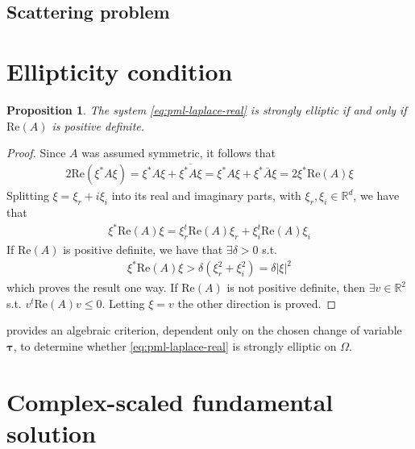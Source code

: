 \documentclass[11pt]{article}
\newcommand{\R}{\mathbb{R}}
\newcommand{\btau}{\boldsymbol{\tau}}
\newtheorem{proposition}[theorem]{Proposition}
\begin{document}
\subsection{Scattering problem}



\appendix

\section{Ellipticity condition}\label{sec:elliptic-condition}

\begin{proposition}
  \label{pr:algebraic-condition-strongly-elliptic}
  The system \cref{eq:pml-laplace-real} is strongly elliptic if and only if
  $\mathrm{Re}(A)$ is positive definite.
\end{proposition}
\begin{proof}
  Since $A$ was assumed symmetric, it follows that
  \begin{align}
  2 \mathrm{Re}(\xi^* A \xi) = \xi^* A \xi + \overline{\xi^* A \xi}= \xi^* A \xi + \xi^* \bar{A} \xi = 2 \xi^* \mathrm{Re}(A) \xi
  \end{align}
  Splitting $\xi = \xi_r + i\xi_i$ into its real and imaginary parts, with
  $\xi_r,\xi_i \in \R^d$, we have that
  \begin{align}
  \xi^* \mathrm{Re}(A) \xi = \xi_r^t \mathrm{Re}(A) \xi_r + \xi_i^t \mathrm{Re}(A) \xi_i
  \end{align}
  If $\mathrm{Re}(A)$ is positive definite, we have that $\exists \delta > 0$ s.t.
  \begin{align}
  \xi^* \mathrm{Re}(A) \xi > \delta (\xi_r^2 + \xi_i^2) = \delta |\xi|^2
  \end{align}
  which proves the result one way. If $\mathrm{Re}(A)$ is not positive definite,
  then $\exists v \in \R^2$ s.t. $v^t \mathrm{Re}(A) v \leq 0$. Letting $\xi = v$
  the other direction is proved.
\end{proof}

 provides an algebraic criterion,
dependent only on the chosen change of variable $\btau$, to determine whether
\cref{eq:pml-laplace-real} is strongly elliptic on $\Omega$. 

\section{Complex-scaled fundamental solution}\label{sec:fundamental-solution}
\end{document}
